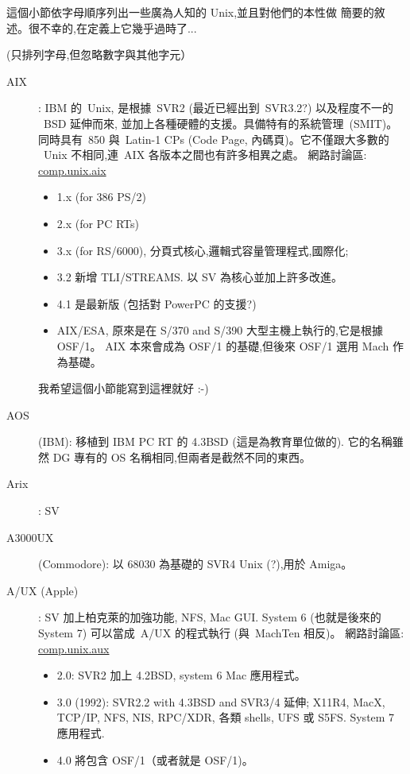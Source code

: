 \documentclass{article}
\begin{document}
\begin{CJK*}{Bg5}{ming}
{      這個小節依字母順序列出一些廣為人知的 Unix,並且對他們的本性做
      簡要的敘述。很不幸的,在定義上它幾乎過時了...

      (只排列字母,但忽略數字與其他字元）
\begin{description}
      \item [AIX]: IBM 的~Unix, 是根據~SVR2 (最近已經出到~SVR3.2?) 以及程度不一的
        ~BSD 延伸而來, 並加上各種硬體的支援。具備特有的系統管理~(SMIT)。
         同時具有~850 與~Latin-1 CPs (Code Page, 內碼頁)。它不僅跟大多數的
        ~Unix 不相同,連~AIX 各版本之間也有許多相異之處。
         網路討論區: \url{comp.unix.aix}
	\begin{itemize}
         \item 1.x (for 386 PS/2)
         \item 2.x (for PC RTs)
         \item 3.x (for RS/6000), 分頁式核心,邏輯式容量管理程式,國際化;
         \item 3.2 新增 TLI/STREAMS.  以 SV 為核心並加上許多改進。
         \item 4.1 是最新版 (包括對 PowerPC 的支援?)
         \item AIX/ESA, 原來是在 S/370 and S/390 大型主機上執行的,它是根據 OSF/1。
           AIX 本來會成為 OSF/1 的基礎,但後來 OSF/1 選用 Mach 作為基礎。
	\end{itemize}
         我希望這個小節能寫到這裡就好 :-)

      \item [AOS] (IBM):  移植到 IBM PC RT 的 4.3BSD (這是為教育單位做的).
      它的名稱雖然 DG 專有的 OS 名稱相同,但兩者是截然不同的東西。

      \item [Arix]:  SV

      \item [A3000UX](Commodore): 以 68030 為基礎的 SVR4 Unix (?),用於 Amiga。

      \item [A/UX (Apple)]: SV 加上柏克萊的加強功能, NFS, Mac GUI.  System 6
         (也就是後來的 System 7) 可以當成~A/UX 的程式執行 (與~MachTen 相反)。
         網路討論區: \url{comp.unix.aux}
	\begin{itemize}
         \item 2.0:  SVR2 加上 4.2BSD, system 6 Mac 應用程式。
         \item 3.0 (1992): SVR2.2 with 4.3BSD and SVR3/4 延伸; X11R4,
           MacX, TCP/IP, NFS, NIS, RPC/XDR, 各類 shells, UFS 或 S5FS.
           System 7 應用程式.
         \item 4.0 將包含 OSF/1（或者就是 OSF/1)。
	\end{itemize}


\end{description}}
\end{CJK*}
\end{document}
